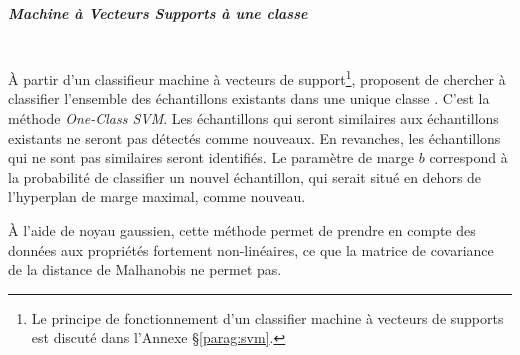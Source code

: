 \subparagraph{Machine à Vecteurs Supports à une classe}\mbox{} \\
À partir d'un classifieur machine à vecteurs de support\footnote{Le principe de fonctionnement d'un classifier machine à vecteurs de supports est discuté dans l'Annexe §\ref{parag:svm}.}, \citeauthor{scholkopf_support_1999} proposent de chercher à classifier l'ensemble des échantillons existants dans une unique classe \cite{scholkopf_support_1999, scholkopf_estimating_2001}.
C'est la méthode \textit{One-Class SVM}.
Les échantillons qui seront similaires aux échantillons existants ne seront pas détectés comme nouveaux.
En revanches, les échantillons qui ne sont pas similaires seront identifiés.
Le paramètre de marge $b$ correspond à la probabilité de classifier un nouvel échantillon, qui serait situé en dehors de l'hyperplan de marge maximal, comme nouveau.

À l'aide de noyau gaussien, cette méthode permet de prendre en compte des données aux propriétés fortement non-linéaires, ce que la matrice de covariance de la distance de Malhanobis ne permet pas.


%

%

